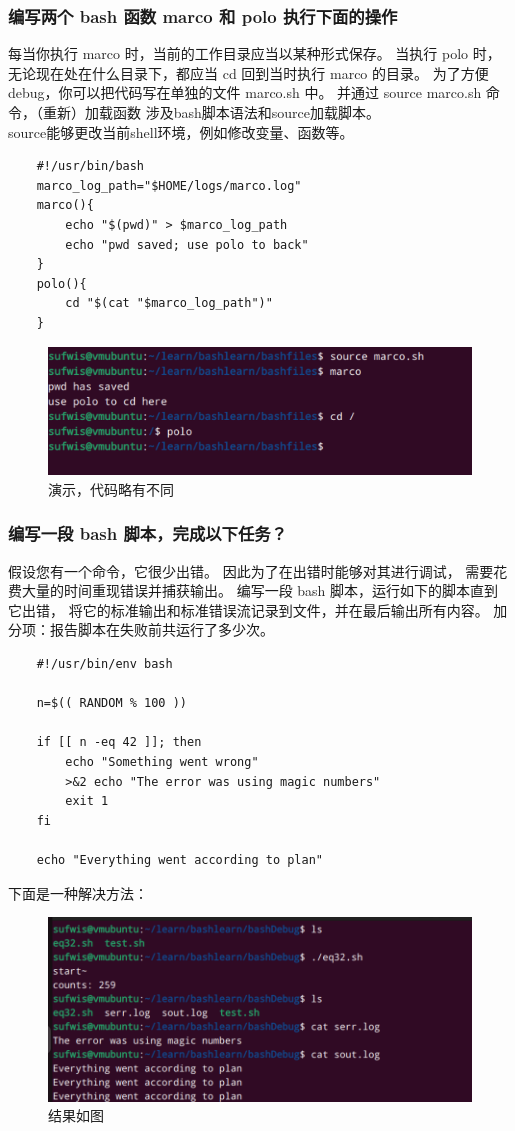 \documentclass[UTF8]{ctexart}
\begin{document}
\subsubsection{编写两个 bash 函数 marco 和 polo 执行下面的操作}
每当你执行 marco 时，当前的工作目录应当以某种形式保存。
当执行 polo 时，无论现在处在什么目录下，都应当 cd 回到当时执行 marco 的目录。
为了方便 debug，你可以把代码写在单独的文件 marco.sh 中。
并通过 source marco.sh 命令，（重新）加载函数
涉及bash脚本语法和source加载脚本。\\
source能够更改当前shell环境，例如修改变量、函数等。\\
\begin{lstlisting}
	#!/usr/bin/bash
	marco_log_path="$HOME/logs/marco.log"
	marco(){
		echo "$(pwd)" > $marco_log_path
		echo "pwd saved; use polo to back"
	}
	polo(){
		cd "$(cat "$marco_log_path")"
	}
\end{lstlisting}
\begin{figure}[H]
	\centering
	\includegraphics[width=0.7\linewidth]{figures/marco_polo.png}
	\caption{演示，代码略有不同}
\end{figure}

\subsubsection{编写一段 bash 脚本，完成以下任务？}
假设您有一个命令，它很少出错。
因此为了在出错时能够对其进行调试，
需要花费大量的时间重现错误并捕获输出。 
编写一段 bash 脚本，运行如下的脚本直到它出错，
将它的标准输出和标准错误流记录到文件，并在最后输出所有内容。 
加分项：报告脚本在失败前共运行了多少次。
\begin{lstlisting}
	#!/usr/bin/env bash

 	n=$(( RANDOM % 100 ))

 	if [[ n -eq 42 ]]; then
    	echo "Something went wrong"
    	>&2 echo "The error was using magic numbers"
    	exit 1
 	fi

 	echo "Everything went according to plan"
\end{lstlisting}
下面是一种解决方法：\\

\begin{figure}[H]
	\centering
	\includegraphics[width=0.7\linewidth]{figures/eq.png}
	\caption{结果如图}
\end{figure}
\end{document}
